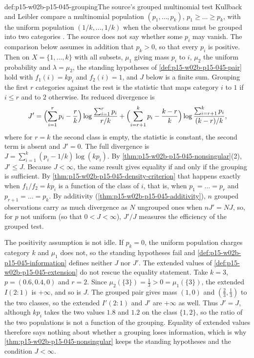 \begin{hbexample}{def:p15-w02b-p15-045-grouping}{The source's grouped multinomial test}
Kullback and Leibler compare a multinomial population
\((p_1,\dots,p_k)\), \(p_1\geq\dots\geq p_k\), with the uniform population
\((1/k,\dots,1/k)\) when the observations must be grouped into two
categories \cite[pp.~85--86]{KullbackLeibler1951Information}. The
source does not say whether some \(p_i\) may vanish. The comparison
below assumes in addition that \(p_k>0\), so that every \(p_i\) is
positive. Then on \(X=\{1,\dots,k\}\) with all subsets, \(\mu_1\) giving
mass \(p_i\) to \(i\), \(\mu_2\) the uniform probability and
\(\lambda=\mu_2\), the standing hypotheses of
\cref{def:p15-w02b-p15-045-pair} hold with \(f_1(i)=kp_i\) and
\(f_2(i)=1\), and \(J\) below is a finite sum. Grouping
the first \(r\) categories against the rest is the statistic that maps
category \(i\) to \(1\) if \(i\leq r\) and to \(2\) otherwise. Its reduced
divergence is
\[
  J'=\Bigl(\sum_{i=1}^rp_i-\frac rk\Bigr)\log\frac{\sum_{i=1}^rp_i}{r/k}
    +\Bigl(\sum_{i=r+1}^kp_i-\frac{k-r}k\Bigr)\log\frac{\sum_{i=r+1}^kp_i}{(k-r)/k},
\]
where for \(r=k\) the second class is empty, the statistic is constant,
the second term is absent and \(J'=0\). The full divergence is
\(J=\sum_{i=1}^k(p_i-1/k)\log(kp_i)\). By
\cref{thm:p15-w02b-p15-045-nonsingular}(2), \(J'\leq J\). Because
\(J<\infty\), the same result gives equality if and only if the grouping
is sufficient. By \cref{thm:p15-w02b-p15-045-density-criterion} that
happens exactly when \(f_1/f_2=kp_i\) is a function of the class of
\(i\), that is, when \(p_1=\dots=p_r\) and \(p_{r+1}=\dots=p_k\). By
additivity (\cref{thm:p15-w02b-p15-045-additivity}), \(n\) grouped
observations carry as much divergence as \(N\) ungrouped ones when
\(nJ'=NJ\), so, for \(p\) not uniform (so that \(0<J<\infty\)),
\(J'/J\) measures the efficiency of the grouped test.

The positivity assumption is not idle. If \(p_k=0\), the uniform
population charges category \(k\) and \(\mu_1\) does not, so the
standing hypotheses fail and \cref{def:p15-w02b-p15-045-information}
defines neither \(J\) nor \(J'\). The extended values of
\cref{def:p15-w02b-p15-045-extension} do not rescue the equality
statement. Take \(k=3\), \(p=(0.6,0.4,0)\) and \(r=2\). Since
\(\mu_2(\{3\})=\tfrac13>0=\mu_1(\{3\})\), the extended \(I(2:1)\) is
\(+\infty\), and so is \(J\). The grouped pair gives mass \((1,0)\) and
\((\tfrac23,\tfrac13)\) to the two classes, so the extended \(I'(2:1)\)
and \(J'\) are \(+\infty\) as well. Thus \(J'=J\), although
\(kp_i\) takes the two values \(1.8\) and \(1.2\) on the class
\(\{1,2\}\), so the ratio of the two populations is not a function of the
grouping. Equality of extended values therefore says nothing about
whether a grouping loses information, which is why
\cref{thm:p15-w02b-p15-045-nonsingular} keeps the standing hypotheses
and the condition \(J<\infty\).


\end{hbexample}
